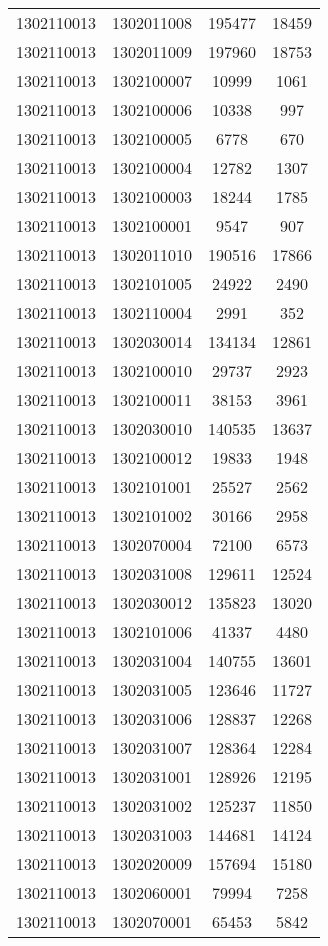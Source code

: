 \begin{longtable}{llcc}
1302110013 & 1302011008 & 195477 & 18459\\
1302110013 & 1302011009 & 197960 & 18753\\
1302110013 & 1302100007 & 10999 & 1061\\
1302110013 & 1302100006 & 10338 & 997\\
1302110013 & 1302100005 & 6778 & 670\\
1302110013 & 1302100004 & 12782 & 1307\\
1302110013 & 1302100003 & 18244 & 1785\\
1302110013 & 1302100001 & 9547 & 907\\
1302110013 & 1302011010 & 190516 & 17866\\
1302110013 & 1302101005 & 24922 & 2490\\
1302110013 & 1302110004 & 2991 & 352\\
1302110013 & 1302030014 & 134134 & 12861\\
1302110013 & 1302100010 & 29737 & 2923\\
1302110013 & 1302100011 & 38153 & 3961\\
1302110013 & 1302030010 & 140535 & 13637\\
1302110013 & 1302100012 & 19833 & 1948\\
1302110013 & 1302101001 & 25527 & 2562\\
1302110013 & 1302101002 & 30166 & 2958\\
1302110013 & 1302070004 & 72100 & 6573\\
1302110013 & 1302031008 & 129611 & 12524\\
1302110013 & 1302030012 & 135823 & 13020\\
1302110013 & 1302101006 & 41337 & 4480\\
1302110013 & 1302031004 & 140755 & 13601\\
1302110013 & 1302031005 & 123646 & 11727\\
1302110013 & 1302031006 & 128837 & 12268\\
1302110013 & 1302031007 & 128364 & 12284\\
1302110013 & 1302031001 & 128926 & 12195\\
1302110013 & 1302031002 & 125237 & 11850\\
1302110013 & 1302031003 & 144681 & 14124\\
1302110013 & 1302020009 & 157694 & 15180\\
1302110013 & 1302060001 & 79994 & 7258\\
1302110013 & 1302070001 & 65453 & 5842\\

\end{longtable}
